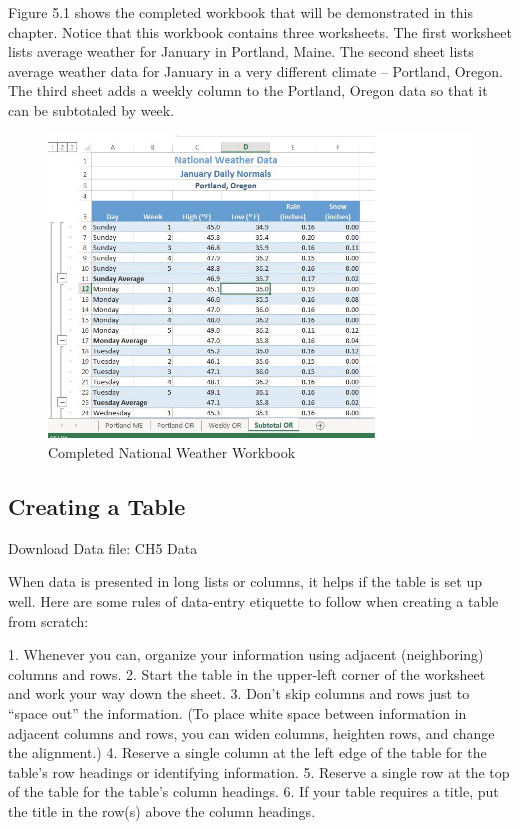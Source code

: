 Figure 5.1 shows the completed workbook that will be demonstrated in this chapter. Notice that
this workbook contains three worksheets. The first worksheet lists average weather for January in
Portland, Maine. The second sheet lists average weather data for January in a very different climate –
Portland, Oregon. The third sheet adds a weekly column to the Portland, Oregon data so that it can
be subtotaled by week.


\begin{figure}[H]
	\centering
	\includegraphics[width=\maxwidth{.95\linewidth}]{gfx/ch05_fig01}
	\caption{Completed National Weather Workbook}
	\label{05:fig01}
\end{figure}






\subsection{Creating a Table}

Download Data file: CH5 Data

When data is presented in long lists or columns, it helps if the table is set up well. Here are some rules
of data-entry etiquette to follow when creating a table from scratch:

1. Whenever you can, organize your information using adjacent (neighboring) columns and rows.
2. Start the table in the upper-left corner of the worksheet and work your way down the sheet.
3. Don’t skip columns and rows just to “space out” the information. (To place white space between
information in adjacent columns and rows, you can widen columns, heighten rows, and change
the alignment.)
4. Reserve a single column at the left edge of the table for the table’s row headings or identifying
information.
5. Reserve a single row at the top of the table for the table’s column headings.
6. If your table requires a title, put the title in the row(s) above the column headings.

